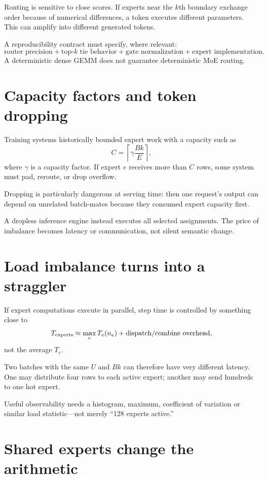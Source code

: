 Routing is sensitive to close scores. If experts near the $k$th boundary exchange order
because of numerical differences, a token executes different parameters. This can
amplify into different generated tokens.

A reproducibility contract must specify, where relevant:
\[
\text{router precision}+
\text{top-$k$ tie behavior}+
\text{gate normalization}+
\text{expert implementation}.
\]
A deterministic dense GEMM does not guarantee deterministic MoE routing.

\section{Capacity factors and token dropping}

Training systems historically bounded expert work with a capacity such as
\[
C=\left\lceil
\gamma\frac{Bk}{E}
\right\rceil,
\]
where $\gamma$ is a capacity factor. If expert $e$ receives more than $C$ rows, some
system must pad, reroute, or drop overflow.

Dropping is particularly dangerous at serving time: then one request's output can
depend on unrelated batch-mates because they consumed expert capacity first.

A dropless inference engine instead executes all selected assignments. The price of
imbalance becomes latency or communication, not silent semantic change.

\section{Load imbalance turns into a straggler}

If expert computations execute in parallel, step time is controlled by something close
to
\[
T_{\rm experts}\approx
\max_e T_e(n_e)
+\text{dispatch/combine overhead},
\]
not the average $T_e$.

Two batches with the same $U$ and $Bk$ can therefore have very different latency. One
may distribute four rows to each active expert; another may send hundreds to one hot
expert.

Useful observability needs a histogram, maximum, coefficient of variation or similar
load statistic---not merely ``128 experts active.''

\section{Shared experts change the arithmetic}

